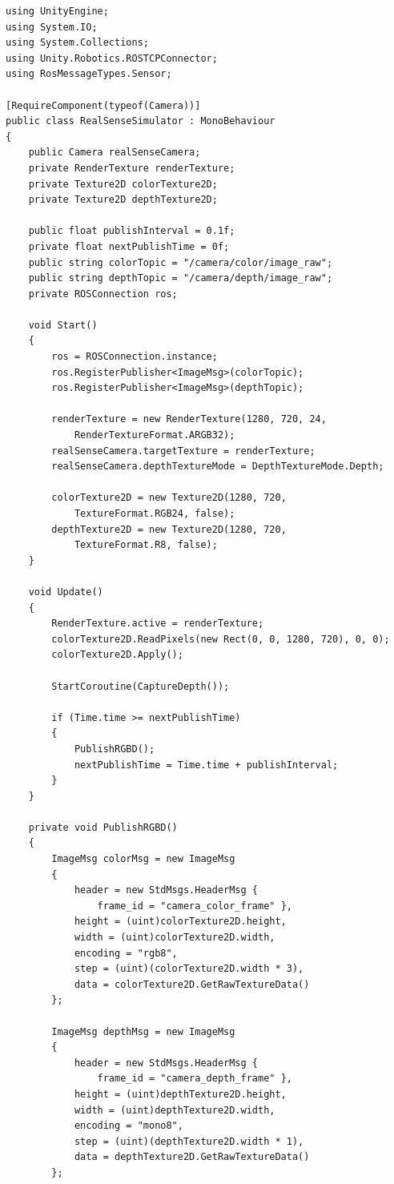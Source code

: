 \documentclass[11pt]{report}
\begin{document}
\begin{lstlisting}[caption=Publisher di Unity, label=lst:base, lineskip=0.3em]
using UnityEngine;
using System.IO;
using System.Collections;
using Unity.Robotics.ROSTCPConnector;
using RosMessageTypes.Sensor;

[RequireComponent(typeof(Camera))]
public class RealSenseSimulator : MonoBehaviour
{
    public Camera realSenseCamera;
    private RenderTexture renderTexture;
    private Texture2D colorTexture2D;
    private Texture2D depthTexture2D;
    
    public float publishInterval = 0.1f;
    private float nextPublishTime = 0f;
    public string colorTopic = "/camera/color/image_raw";
    public string depthTopic = "/camera/depth/image_raw";
    private ROSConnection ros;

    void Start()
    {
        ros = ROSConnection.instance;
        ros.RegisterPublisher<ImageMsg>(colorTopic);
        ros.RegisterPublisher<ImageMsg>(depthTopic);

        renderTexture = new RenderTexture(1280, 720, 24, 
            RenderTextureFormat.ARGB32);
        realSenseCamera.targetTexture = renderTexture;
        realSenseCamera.depthTextureMode = DepthTextureMode.Depth;
        
        colorTexture2D = new Texture2D(1280, 720, 
            TextureFormat.RGB24, false);
        depthTexture2D = new Texture2D(1280, 720, 
            TextureFormat.R8, false);
    }

    void Update()
    {
        RenderTexture.active = renderTexture;
        colorTexture2D.ReadPixels(new Rect(0, 0, 1280, 720), 0, 0);
        colorTexture2D.Apply();
        
        StartCoroutine(CaptureDepth());

        if (Time.time >= nextPublishTime)
        {
            PublishRGBD();
            nextPublishTime = Time.time + publishInterval;
        }
    }

    private void PublishRGBD()
    {
        ImageMsg colorMsg = new ImageMsg
        {
            header = new StdMsgs.HeaderMsg { 
                frame_id = "camera_color_frame" },
            height = (uint)colorTexture2D.height,
            width = (uint)colorTexture2D.width,
            encoding = "rgb8",
            step = (uint)(colorTexture2D.width * 3),
            data = colorTexture2D.GetRawTextureData()
        };

        ImageMsg depthMsg = new ImageMsg
        {
            header = new StdMsgs.HeaderMsg { 
                frame_id = "camera_depth_frame" },
            height = (uint)depthTexture2D.height,
            width = (uint)depthTexture2D.width,
            encoding = "mono8",
            step = (uint)(depthTexture2D.width * 1),
            data = depthTexture2D.GetRawTextureData()
        };


\end{lstlisting}
\end{document}

